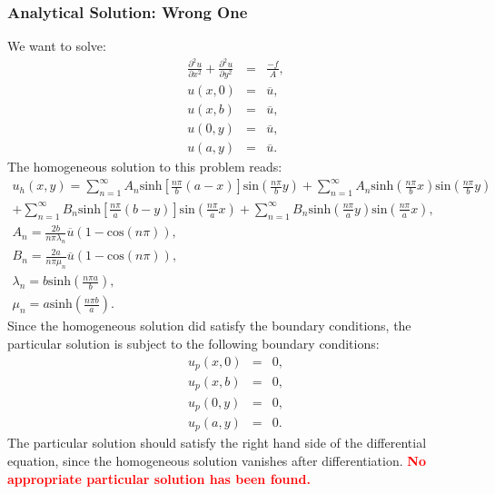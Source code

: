 \documentclass[a4paper,12pt]{article}
\begin{document}
\subsubsection{Analytical Solution: Wrong One}
We want to solve:
\begin{eqnarray}\label{eqn:problrec}
 \frac{\partial^2 u}{\partial x^2} + \frac{\partial^2 u}{\partial y^2} &=& \frac{-f}{A},\\
  u(x,0)  &=& \overline{u},\\
u(x,b)  &=& \overline{u},\\
u(0,y)  &=& \overline{u},\\
u(a,y)  &=&  \overline{u}.
\end{eqnarray}
The homogeneous solution to this problem reads:
\begin{eqnarray}
 u_h(x,y) = \sum_{n=1}^{\infty}A_n\text{sinh}[\frac{n\pi}{b}(a-x)]\text{sin}(\frac{n\pi}{b}y) +\sum_{n=1}^{\infty}A_n\text{sinh}(\frac{n\pi}{b}x)\text{sin}(\frac{n\pi}{b}y) \\
+\sum_{n=1}^{\infty}B_n\text{sinh}[\frac{n\pi}{a}(b-y)]\text{sin}(\frac{n\pi}{a}x)
+\sum_{n=1}^{\infty}B_n\text{sinh}(\frac{n\pi}{a}y)\text{sin}(\frac{n\pi}{a}x),\\
A_n = \frac{2b}{n\pi\lambda_n} \overline{u}(1-\text{cos}(n\pi)),\\
B_n = \frac{2a}{n\pi\mu_n} \overline{u}(1-\text{cos}(n\pi)),\\
\lambda_n = b \text{sinh}(\frac{n\pi a}{b}),\\
\mu_n = a \text{sinh}(\frac{n\pi b}{a}).
\end{eqnarray}
Since the homogeneous solution did satisfy the boundary conditions, the particular solution is subject to the following boundary conditions:
\begin{eqnarray}
u_p(x,0)  &=& 0,\\
u_p(x,b)  &=& 0,\\
u_p(0,y)  &=& 0,\\
u_p(a,y)  &=& 0.
\end{eqnarray}
The particular solution should satisfy the right hand side of the differential equation, since the homogeneous solution vanishes after differentiation. \textcolor{red}{\textbf{No appropriate particular solution has been found.}}
\end{document}
